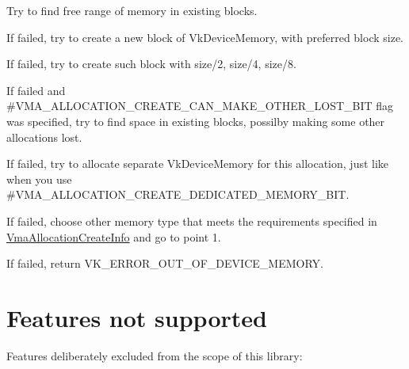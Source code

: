 \begin{DoxyEnumerate}
\item Try to find free range of memory in existing blocks.
\item If failed, try to create a new block of {\ttfamily Vk\+Device\+Memory}, with preferred block size.
\item If failed, try to create such block with size/2, size/4, size/8.
\item If failed and \#\+V\+M\+A\+\_\+\+A\+L\+L\+O\+C\+A\+T\+I\+O\+N\+\_\+\+C\+R\+E\+A\+T\+E\+\_\+\+C\+A\+N\+\_\+\+M\+A\+K\+E\+\_\+\+O\+T\+H\+E\+R\+\_\+\+L\+O\+S\+T\+\_\+\+B\+IT flag was specified, try to find space in existing blocks, possilby making some other allocations lost.
\item If failed, try to allocate separate {\ttfamily Vk\+Device\+Memory} for this allocation, just like when you use \#\+V\+M\+A\+\_\+\+A\+L\+L\+O\+C\+A\+T\+I\+O\+N\+\_\+\+C\+R\+E\+A\+T\+E\+\_\+\+D\+E\+D\+I\+C\+A\+T\+E\+D\+\_\+\+M\+E\+M\+O\+R\+Y\+\_\+\+B\+IT.
\item If failed, choose other memory type that meets the requirements specified in \hyperlink{structVmaAllocationCreateInfo}{Vma\+Allocation\+Create\+Info} and go to point 1.
\item If failed, return {\ttfamily V\+K\+\_\+\+E\+R\+R\+O\+R\+\_\+\+O\+U\+T\+\_\+\+O\+F\+\_\+\+D\+E\+V\+I\+C\+E\+\_\+\+M\+E\+M\+O\+RY}.
\end{DoxyEnumerate}\hypertarget{general_considerations_general_considerations_features_not_supported}{}\section{Features not supported}\label{general_considerations_general_considerations_features_not_supported}
Features deliberately excluded from the scope of this library\+:


